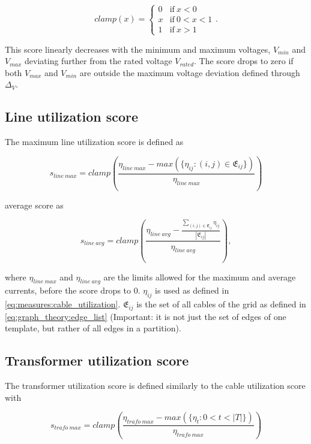 \begin{equation}
    clamp(x) =
    \begin{cases}
        0 & \text{if} \ x < 0\\
        x & \text{if} \ 0 < x < 1\\
        1 & \text{if} \ x > 1
    \end{cases}.
\end{equation}

This score linearly decreases with the minimum and maximum voltages, 
$V_{min}$ and $V_{max}$ deviating further from the rated voltage $V_{rated}$.
The score drops to zero if both $V_{max}$ and $V_{min}$ are outside the
maximum voltage deviation defined through $\Delta_V$.

\subsection{Line utilization score}

The maximum line utilization score is defined as

\begin{equation}
    s_{line \ max} = clamp(\frac{\eta_{line \ max} - max(\{\eta_{ij} : (i, j) \in \mathfrak{E}_{ij}\})}{\eta_{line \ max}})
\end{equation}

average score as

\begin{equation}
    s_{line \ avg} = clamp(\frac{\eta_{line \ avg} - \frac{\sum_{(i, j) \in \mathfrak{E}_{ij}} \eta_{ij}}{|\mathfrak{E}_{ij}|}}{\eta_{line \ avg}}),
\end{equation}

where $\eta_{line \ max}$ and $\eta_{line \ avg}$ are the limits
allowed for the maximum and average currents, before the score drops to 0.
$\eta_{ij}$ is used as defined in \autoref{eq:measures:cable_utilization}.
$\mathfrak{E}_{ij}$ is the set of all cables of the
grid as defined in \autoref{eq:graph_theory:edge_list}
(Important: it is not just the set of edges of one template, but rather of all edges in 
a partition).

\subsection{Transformer utilization score}

The transformer utilization score is defined similarly
to the cable utilization score with

\begin{equation}
    s_{trafo \ max} = clamp(\frac{\eta_{trafo \ max} - max(\{\eta_{t} : 0 < t < |T|\})}{\eta_{trafo \ max}})
\end{equation}

